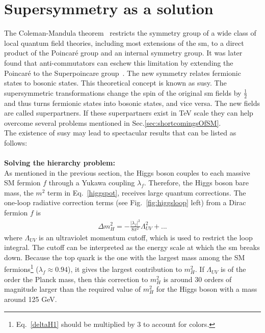 \section{Supersymmetry as a solution}
\label{sec:susySol}
The Coleman-Mandula theorem~\cite{CMT} restricts the symmetry group of a wide class of local quantum field theories, including most extensions of the \acrshort{sm}, to a direct product of the Poincar\'{e} group and an internal symmetry group. It was later found that anti-commutators can eschew this limitation by extending the Poincar\'{e} to the Superpoincare group~\cite{Psusy2}. The new symmetry relates fermionic states to bosonic states.
 This theoretical concept is known as \acrshort{susy}. The supersymmetric transformations change the spin of the original \acrshort{sm} fields by $\frac{1}{2}$ and thus turns fermionic states into bosonic states, and vice versa. The new fields are called superpartners. If these superpartners exist in TeV scale they can help overcome several problems mentioned in Sec.\ref{sec:shortcomingsOfSM}. \\
The existence of \acrshort{susy} may lead to spectacular results that can be listed as follows:\\
\\
\textbf{Solving the hierarchy problem:}
\\
As mentioned in the previous section, the Higgs boson couples to each massive SM fermion $f$ through a Yukawa coupling  $\lambda_f$. Therefore, the Higgs boson bare mass, the $m^2$ term in Eq.~\ref{higgspot}, receives large quantum corrections. The one-loop radiative correction terms (see Fig.~\ref{fig:higgsloop} left) from a Dirac fermion $f$ is
\begin{eqnarray}
\label{deltaH1}
{\Delta m_H^2 = - \frac{|\lambda_f|^2}{8\pi^2}\Lambda_{UV}^2+...}
\end{eqnarray}
where $\Lambda_{UV}$ is an ultraviolet momentum cutoff, which is used to restrict the loop integral. The cutoff can be interpreted as the energy scale at which the \acrshort{sm} breaks down. 
Because the top quark is the one with the largest mass among the SM fermions\footnote{Eq.~\ref{deltaH1} should be multiplied by 3 to account for colors.} ($\lambda_f \approx 0.94$), it gives the largest contribution to $m_H^2$. If $\Lambda_{UV}$ is of the order the Planck mass, then this correction to $m_H^2$ is around 30 orders of magnitude larger than the required value of $m_H^2$ for the Higgs boson with a mass around 125 GeV.
